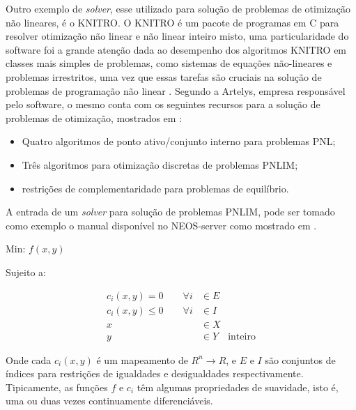 Outro exemplo de \emph{solver}, esse utilizado para solução de problemas de otimização não lineares, é o KNITRO.
O KNITRO é um pacote de programas em C para resolver otimização não linear e não linear inteiro misto, uma particularidade do software foi a grande atenção dada ao desempenho dos algoritmos KNITRO em classes mais simples de problemas, como sistemas de equações não-lineares e problemas irrestritos, uma vez que essas tarefas são cruciais na solução de problemas de programação não linear \cite{Byrd2006Knitro:Optimization}.
Segundo a Artelys, empresa responsável pelo software, o mesmo conta com os seguintes recursos para a solução de problemas de otimização, mostrados em \cite{knitroweb}:

\begin{itemize}
    \item Quatro algoritmos de ponto ativo/conjunto interno para problemas PNL;
    
    \item Três algoritmos para otimização discretas de problemas PNLIM;
    
    \item restrições de complementaridade para problemas de equilíbrio.
\end{itemize}

A entrada de um \emph{solver} para solução de problemas PNLIM, pode ser tomado como exemplo o manual disponível no NEOS-server como mostrado em \cite{neosguide}.

\begin{tcolorbox}[colback=white!10,title =\textbf{Conceitos básicos }]
    \begin{minipage}{\dimexpr\textwidth-\shadowsize-2\fboxrule-2\fboxsep-8pt}
    
    \begin{center}
        Min: $f(x,y)$   
    \end{center}

    \hspace{2cm}Sujeito a: 

    \begin{align*}
        c_{i}(x,y) = 0 \qquad \forall i&\in E\\
        c_{i}(x,y) \leq 0 \qquad \forall i&\in I\\
        x \qquad &\in X\\
        y \qquad &\in Y \quad \text{inteiro}
    \end{align*}
    \end{minipage}
    
    \vspace{1cm}
    
    Onde cada $c_{i}(x,y)$ é um mapeamento de $R^n \to R$, e $E$ e $I$ são conjuntos de índices para restrições de igualdades e desigualdades respectivamente. Tipicamente, as funções $f$ e $c_{i}$ têm algumas propriedades de suavidade, isto é, uma ou duas vezes continuamente diferenciáveis.
\end{tcolorbox}


